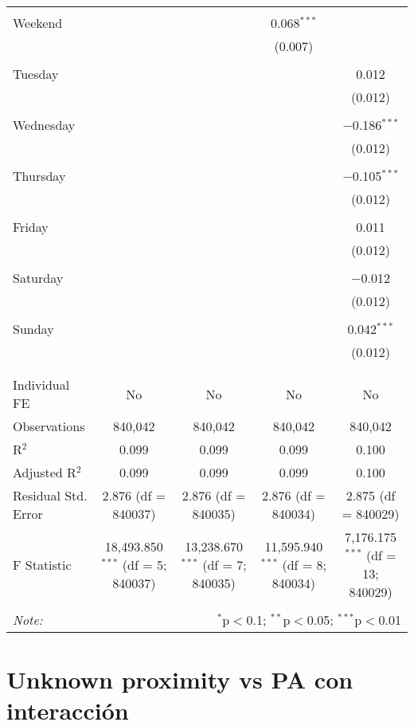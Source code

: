 \documentclass[
]{article}
\begin{document}
\begin{table}[!htbp]
{\begin{tabular}{@{\extracolsep{5pt}}lcccc}
  & & & & \\ 
 Weekend &  &  & 0.068$^{***}$ &  \\ 
  &  &  & (0.007) &  \\ 
  & & & & \\ 
 Tuesday &  &  &  & 0.012 \\ 
  &  &  &  & (0.012) \\ 
  & & & & \\ 
 Wednesday &  &  &  & $-$0.186$^{***}$ \\ 
  &  &  &  & (0.012) \\ 
  & & & & \\ 
 Thursday &  &  &  & $-$0.105$^{***}$ \\ 
  &  &  &  & (0.012) \\ 
  & & & & \\ 
 Friday &  &  &  & 0.011 \\ 
  &  &  &  & (0.012) \\ 
  & & & & \\ 
 Saturday &  &  &  & $-$0.012 \\ 
  &  &  &  & (0.012) \\ 
  & & & & \\ 
 Sunday &  &  &  & 0.042$^{***}$ \\ 
  &  &  &  & (0.012) \\ 
  & & & & \\ 
\hline \\[-1.8ex] 
Individual FE & No & No & No & No \\ 
Observations & 840,042 & 840,042 & 840,042 & 840,042 \\ 
R$^{2}$ & 0.099 & 0.099 & 0.099 & 0.100 \\ 
Adjusted R$^{2}$ & 0.099 & 0.099 & 0.099 & 0.100 \\ 
Residual Std. Error & 2.876 (df = 840037) & 2.876 (df = 840035) & 2.876 (df = 840034) & 2.875 (df = 840029) \\ 
F Statistic & 18,493.850$^{***}$ (df = 5; 840037) & 13,238.670$^{***}$ (df = 7; 840035) & 11,595.940$^{***}$ (df = 8; 840034) & 7,176.175$^{***}$ (df = 13; 840029) \\ 
\hline 
\hline \\[-1.8ex] 
\textit{Note:}  & \multicolumn{4}{r}{$^{*}$p$<$0.1; $^{**}$p$<$0.05; $^{***}$p$<$0.01} \\ 
\end{tabular}
} 
\end{table} 
\newpage
\section{Unknown proximity vs PA con interacción}
\end{document}
